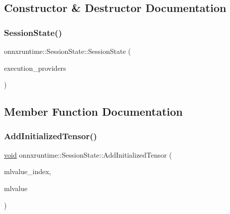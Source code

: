 \subsection{Constructor \& Destructor Documentation}
\mbox{\label{classonnxruntime_1_1SessionState_a205e81db480190a6094007f4076968e7}} 
\subsubsection{\texorpdfstring{Session\+State()}{SessionState()}}
{\footnotesize\ttfamily onnxruntime\+::\+Session\+State\+::\+Session\+State (\begin{DoxyParamCaption}\item[{const \mbox{\hyperlink{classonnxruntime_1_1ExecutionProviders}{Execution\+Providers}} \&}]{execution\+\_\+providers }\end{DoxyParamCaption})\hspace{0.3cm}{\ttfamily [inline]}}



\subsection{Member Function Documentation}
\mbox{\label{classonnxruntime_1_1SessionState_a042cc35f37efe8e514d3079a3057b4bc}} 
\subsubsection{\texorpdfstring{Add\+Initialized\+Tensor()}{AddInitializedTensor()}}
{\footnotesize\ttfamily \mbox{\hyperlink{mlasi_8h_a88f941d423cb2a819b70a1358982b1a6}{void}} onnxruntime\+::\+Session\+State\+::\+Add\+Initialized\+Tensor (\begin{DoxyParamCaption}\item[{int}]{mlvalue\+\_\+index,  }\item[{const \mbox{\hyperlink{classonnxruntime_1_1MLValue}{M\+L\+Value}} \&}]{mlvalue }\end{DoxyParamCaption})}

